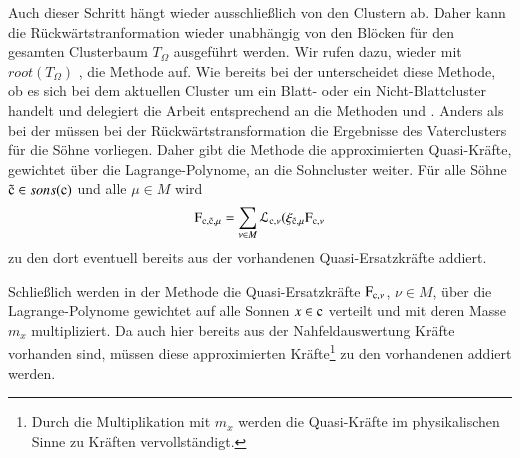     Auch dieser Schritt hängt wieder ausschließlich von den Clustern ab. Daher kann die Rückwärtstranformation wieder unabhängig von den Blöcken für den gesamten Clusterbaum $T_\Omega$ ausgeführt
    werden. Wir rufen dazu, wieder mit $root(T_\Omega)$ , die Methode  auf. Wie bereits bei der \vorw unterscheidet diese Methode, ob es sich bei
    dem aktuellen Cluster um ein Blatt- oder ein Nicht-Blattcluster handelt und delegiert die Arbeit entsprechend an die Methoden  und 
    . Anders als bei der \vorw müssen bei der Rückwärtstransformation die Ergebnisse des Vaterclusters für die Söhne vorliegen. Daher gibt die
    Methode  die approximierten Quasi-Kräfte, gewichtet über die Lagrange-Polynome, an die Sohncluster weiter. Für alle Söhne $\tilde{\tcode{c}} \in sons(\tcode c)$
    und alle $\mu \in M$ wird
    \[
      \tcode{F}_{\tcode{c},\tilde{\tcode{c}},\mu} = \sum_{\nu \in M} \lag_{\tcode{c},\nu}(\xi_{\tilde{\tcode{c}},\mu} \tcode{F}_{\tcode{c},\nu}
    \]
    zu den dort eventuell bereits aus der \koppl vorhandenen Quasi-Ersatzkräfte addiert.
    
    Schließlich werden in der Methode  die Quasi-Ersatzkräfte $\tcode{F}_{\tcode{c},\nu}$, $\nu \in M$, über die Lagrange-Polynome gewichtet auf alle Sonnen 
    $x \in \tcode{c}$ verteilt und mit deren Masse $m_x$ multipliziert. Da auch hier bereits aus der Nahfeldauswertung Kräfte vorhanden sind, müssen diese approximierten Kräfte\footnote{Durch die
    Multiplikation mit $m_x$ werden die Quasi-Kräfte im physikalischen Sinne zu Kräften vervollständigt.} zu den vorhandenen addiert werden.
    

  \clearpage
